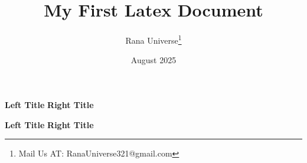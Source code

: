 \documentclass[12pt, letterpaper]{article}
\title{My First Latex Document}
\author{Rana Universe\thanks{Mail Us AT: RanaUniverse321@gmail.com}}
\date{August 2025}
\begin{document}
\maketitle



\textbf{Left Title} \hfil \textbf{Right Title}


\textbf{Left Title} \hfill \textbf{Right Title}


\end{document}
